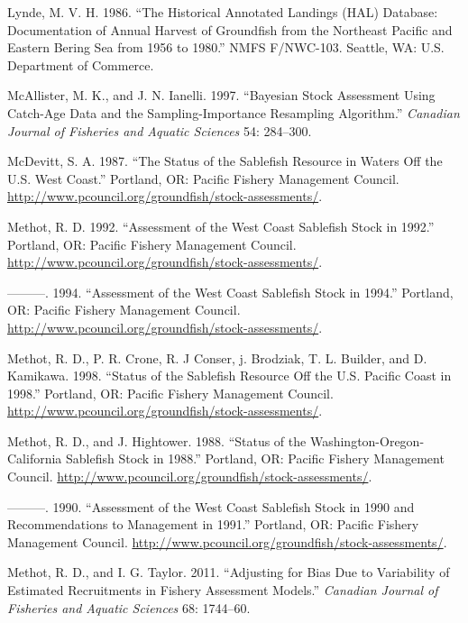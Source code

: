 \documentclass[11pt,
  english,
  a4paper,
]{article}
\begin{document}
\begin{cslreferences}
\leavevmode\hypertarget{ref-lynde1986}{}%
Lynde, M. V. H. 1986. ``The Historical Annotated Landings (HAL) Database: Documentation of Annual Harvest of Groundfish from the Northeast Pacific and Eastern Bering Sea from 1956 to 1980.'' NMFS F/NWC-103. Seattle, WA: U.S. Department of Commerce.

\leavevmode\hypertarget{ref-McAllisterIanelli1997}{}%
McAllister, M. K., and J. N. Ianelli. 1997. ``Bayesian Stock Assessment Using Catch-Age Data and the Sampling-Importance Resampling Algorithm.'' \emph{Canadian Journal of Fisheries and Aquatic Sciences} 54: 284--300.

\leavevmode\hypertarget{ref-mcdevitt1987sablefish}{}%
McDevitt, S. A. 1987. ``The Status of the Sablefish Resource in Waters Off the U.S. West Coast.'' Portland, OR: Pacific Fishery Management Council. \url{http://www.pcouncil.org/groundfish/stock-assessments/}.

\leavevmode\hypertarget{ref-methot1992}{}%
Methot, R. D. 1992. ``Assessment of the West Coast Sablefish Stock in 1992.'' Portland, OR: Pacific Fishery Management Council. \url{http://www.pcouncil.org/groundfish/stock-assessments/}.

\leavevmode\hypertarget{ref-methot1994}{}%
---------. 1994. ``Assessment of the West Coast Sablefish Stock in 1994.'' Portland, OR: Pacific Fishery Management Council. \url{http://www.pcouncil.org/groundfish/stock-assessments/}.

\leavevmode\hypertarget{ref-methot1998sablefish}{}%
Methot, R. D., P. R. Crone, R. J Conser, j. Brodziak, T. L. Builder, and D. Kamikawa. 1998. ``Status of the Sablefish Resource Off the U.S. Pacific Coast in 1998.'' Portland, OR: Pacific Fishery Management Council. \url{http://www.pcouncil.org/groundfish/stock-assessments/}.

\leavevmode\hypertarget{ref-methot1988sablefish}{}%
Methot, R. D., and J. Hightower. 1988. ``Status of the Washington-Oregon-California Sablefish Stock in 1988.'' Portland, OR: Pacific Fishery Management Council. \url{http://www.pcouncil.org/groundfish/stock-assessments/}.

\leavevmode\hypertarget{ref-methot1990sablefish}{}%
---------. 1990. ``Assessment of the West Coast Sablefish Stock in 1990 and Recommendations to Management in 1991.'' Portland, OR: Pacific Fishery Management Council. \url{http://www.pcouncil.org/groundfish/stock-assessments/}.

\leavevmode\hypertarget{ref-MethotTaylor2011}{}%
Methot, R. D., and I. G. Taylor. 2011. ``Adjusting for Bias Due to Variability of Estimated Recruitments in Fishery Assessment Models.'' \emph{Canadian Journal of Fisheries and Aquatic Sciences} 68: 1744--60.


\end{cslreferences}
\end{document}
